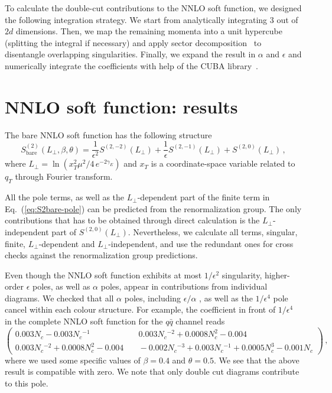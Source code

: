 \documentclass{PoS}
\newcommand{\LT}{L_\perp}
\begin{document}
To calculate the double-cut contributions to the NNLO soft function, we designed
the following integration strategy. We start from analytically integrating 3
out of $2d$ dimensions.  Then, we map the remaining momenta into a unit
hypercube (splitting the integral if necessary) and apply sector
decomposition~\cite{Binoth:2000ps,Binoth:2003ak} to disentangle overlapping
singularities. Finally, we expand the result in $\alpha$ and $\epsilon$ and
numerically integrate the coefficients with help of the CUBA
library~\cite{Hahn:2004fe}.

\section{NNLO soft function: results}

The bare NNLO soft function has the following structure
%
\begin{equation}
  S^{(2)}_\text{bare}(\LT, \beta,\theta)  =
  \frac{1}{\epsilon^2} S^{(2,-2)}(\LT) +
  \frac{1}{\epsilon} S^{(2,-1)}(\LT)
  + S^{(2,0)}(\LT)\,,
  \label{eq:S2bare-pole}
\end{equation}
%
where $ L_\perp = \ln\left(x_T^2\mu^2/4\, e^{-2\gamma_E}\right)$ and $x_T$ is
a coordinate-space variable related to $q_T$ through Fourier transform.

%
All the pole terms, as well as the $\LT$-dependent part of the finite term in
Eq.~(\ref{eq:S2bare-pole}) can be predicted from the renormalization group.
%
The only contributions that has to be obtained through direct calculation is the
$\LT$-independent part of $S^{(2,0)}(\LT)$.  
%
Nevertheless, we calculate all terms, singular, finite, $\LT$-dependent and
$\LT$-independent, and use the redundant ones for cross checks against
the renormalization group predictions.

Even though the NNLO soft function exhibits at most $1/\epsilon^2$ singularity, higher-order $\epsilon$ poles, as well as
$\alpha$ poles, appear in contributions from individual diagrams. 
%
We checked that all $\alpha$ poles, including $\epsilon/\alpha$ , as well as
the $1/\epsilon^4$ pole cancel within each colour structure. For example, the
coefficient in front of $1/\epsilon^4$ in the complete NNLO soft function
for the $q\bar q$ channel reads
%
\begin{equation}
  \left(
  \begin{array}{cc}
   0.003 N_c-0.003 N_c{}^{-1}          & \quad
   0.003 N_c{}^{-2}+0.0008 N_c^2-0.004 \\
   0.003 N_c{}^{-2}+0.0008 N_c^2-0.004 & \quad
   -0.002 N_c{}^{-3}+0.003 N_c{}^{-1}+0.0005 N_c^3-0.001 N_c 
  \end{array}
  \right)\,,
\end{equation}
%
where we used some specific values of $\beta=0.4$ and $\theta=0.5$.
We see that the above result is compatible with zero. We note that only double
cut diagrams contribute to this pole.
\end{document}
